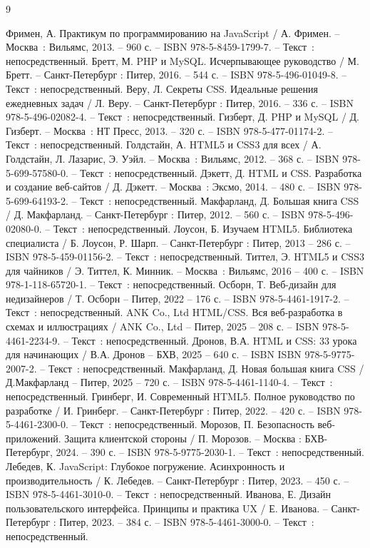 
\begin{thebibliography}{9}
	
	 Фримен, А. Практикум по программированию на JavaScript / А. Фримен. – Москва~: Вильямс, 2013. – 960 с. – ISBN 978-5-8459-1799-7. – Текст~: непосредственный.
	 Бретт, М. PHP и MySQL. Исчерпывающее руководство / М. Бретт. – Санкт-Петербург : Питер, 2016. – 544 с. – ISBN 978-5-496-01049-8. – Текст~: непосредственный.
	 Веру, Л. Секреты CSS. Идеальные решения ежедневных задач / Л. Веру. – Санкт-Петербург : Питер, 2016. – 336 с. – ISBN 978-5-496-02082-4. – Текст~: непосредственный.
		Гизберт, Д. PHP и MySQL / Д. Гизберт. – Москва~: НТ Пресс, 2013. – 320 с. – ISBN 978-5-477-01174-2. – Текст~: непосредственный.
		Голдстайн, А. HTML5 и CSS3 для всех / А. Голдстайн, Л. Лазарис, Э. Уэйл. – Москва~: Вильямс, 2012. – 368 с. – ISBN 978-5-699-57580-0. – Текст~: непосредственный.
		Дэкетт, Д. HTML и CSS. Разработка и создание веб-сайтов / Д. Дэкетт. – Москва~: Эксмо, 2014. – 480 с. – ISBN 978-5-699-64193-2. – Текст~: непосредственный.
		Макфарланд, Д. Большая книга CSS / Д. Макфарланд. – Санкт-Петербург : Питер, 2012. – 560 с. – ISBN 978-5-496-02080-0. – Текст~: непосредственный.
		Лоусон, Б. Изучаем HTML5. Библиотека специалиста / Б. Лоусон, Р. Шарп. – Санкт-Петербург : Питер, 2013 – 286 с. – ISBN 978-5-459-01156-2. – Текст~: непосредственный.
		Титтел, Э. HTML5 и CSS3 для чайников / Э. Титтел, К. Минник. – Москва~: Вильямс, 2016 – 400 с. – ISBN 978-1-118-65720-1. – Текст~: непосредственный.    
		Осборн, Т. Веб-дизайн для недизайнеров / Т. Осборн – Питер, 2022 – 176 с. – ISBN 978-5-4461-1917-2. – Текст~: непосредственный.    
		ANK Co., Ltd  HTML/CSS. Вся веб-разработка в схемах и иллюстрациях  / ANK Co., Ltd –   Питер, 2025 – 208 с. – ISBN 
	978-5-4461-2234-9. – Текст~: непосредственный.    
		Дронов, В.А. HTML и CSS: 33 урока для начинающих / В.А. Дронов – БХВ, 2025 – 640 с. – ISBN ISBN
	978-5-9775-2007-2. – Текст~: непосредственный.    
		Макфарланд, Д. Новая большая книга CSS  / Д.Макфарланд  – Питер, 2025 – 720 с. – ISBN 
	978-5-4461-1140-4. – Текст~: непосредственный.
	 Гринберг, И. Современный HTML5. Полное руководство по разработке / И. Гринберг. – Санкт-Петербург : Питер, 2022. – 420 с. – ISBN 978-5-4461-2300-0. – Текст~: непосредственный.
	 Морозов, П. Безопасность веб-приложений. Защита клиентской стороны / П. Морозов. – Москва : БХВ-Петербург, 2024. – 390 с. – ISBN 978-5-9775-2030-1. – Текст~: непосредственный.
	 Лебедев, К. JavaScript: Глубокое погружение. Асинхронность и производительность / К. Лебедев. – Санкт-Петербург : Питер, 2023. – 450 с. – ISBN 978-5-4461-3010-0. – Текст~: непосредственный.
	 Иванова, Е. Дизайн пользовательского интерфейса. Принципы и практика UX / Е. Иванова. – Санкт-Петербург : Питер, 2023. – 384 с. – ISBN 978-5-4461-3000-0. – Текст~: непосредственный.
\end{thebibliography}
